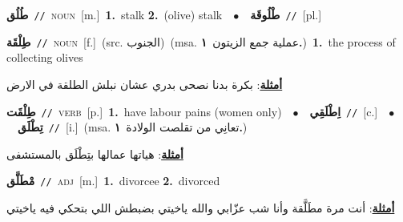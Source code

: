 \documentclass[10pt,a4paper,twoside]{article} %
\begin{document}
\begin{multicols}{2}
{\setlength\topsep{0pt}\textbf{\foreignlanguage{arabic}{طُلُق}}\ {\color{gray}\texttt{//}\color{black}}\ \textsc{noun}\ [m.]\ \textbf{1.}~stalk  \textbf{2.}~(olive) stalk\ \ $\bullet$\ \ \setlength\topsep{0pt}\textbf{\foreignlanguage{arabic}{طْلُوقَة}}\ {\color{gray}\texttt{//}\color{black}}\ [pl.]\ } \vspace{2mm}

{\setlength\topsep{0pt}\textbf{\foreignlanguage{arabic}{طِلْقَة}}\ {\color{gray}\texttt{//}\color{black}}\ \textsc{noun}\ [f.]\ (src. \color{gray}\foreignlanguage{arabic}{الجنوب}\color{black})\ \color{gray}(msa. \foreignlanguage{arabic}{عملية جمع الزيتون}~\foreignlanguage{arabic}{\textbf{١.}})\color{black}\ \textbf{1.}~the process of collecting olives\  \begin{flushright}\color{gray}\foreignlanguage{arabic}{\textbf{\underline{\foreignlanguage{arabic}{أمثلة}}}: بكرة بدنا نصحى بدري عشان نبلش الطلقة في الارض}\end{flushright}\color{black}} \vspace{2mm}

{\setlength\topsep{0pt}\textbf{\foreignlanguage{arabic}{طِلْقَت}}\ {\color{gray}\texttt{//}\color{black}}\ \textsc{verb}\ [p.]\ \textbf{1.}~have labour pains (women only)\ \ $\bullet$\ \ \setlength\topsep{0pt}\textbf{\foreignlanguage{arabic}{اِطْلَقِي}}\ {\color{gray}\texttt{//}\color{black}}\ [c.]\ \ $\bullet$\ \ \setlength\topsep{0pt}\textbf{\foreignlanguage{arabic}{تِطْلَق}}\ {\color{gray}\texttt{//}\color{black}}\ [i.]\ \color{gray}(msa. \foreignlanguage{arabic}{تعانِي من تقلصت الولادة}~\foreignlanguage{arabic}{\textbf{١.}})\color{black}\  \begin{flushright}\color{gray}\foreignlanguage{arabic}{\textbf{\underline{\foreignlanguage{arabic}{أمثلة}}}: هياتها عمالها بتِطْلَق بالمستشفى}\end{flushright}\color{black}} \vspace{2mm}

{\setlength\topsep{0pt}\textbf{\foreignlanguage{arabic}{مْطَلَّق}}\ {\color{gray}\texttt{//}\color{black}}\ \textsc{adj}\ [m.]\ \textbf{1.}~divorcee  \textbf{2.}~divorced\  \begin{flushright}\color{gray}\foreignlanguage{arabic}{\textbf{\underline{\foreignlanguage{arabic}{أمثلة}}}: أنت مرة مطَلَّقة وأنا شب عزّابي والله ياخيتي بضبطش اللي بتحكي فيه ياخيتي}\end{flushright}\color{black}} \vspace{2mm}


\end{multicols}
\end{document}
